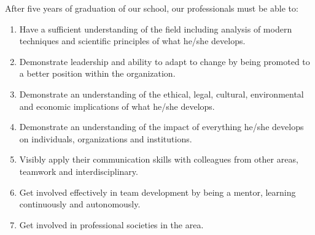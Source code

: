 After five years of graduation of our school, 
our professionals must be able to:
\begin{enumerate}
\item Have a sufficient understanding of the field including analysis of modern techniques and scientific principles of what he/she develops.
\item Demonstrate leadership and ability to adapt to change by being promoted to a better position within the organization.
\item Demonstrate an understanding of the ethical, legal, cultural, environmental and economic implications of what he/she develops.
\item Demonstrate an understanding of the impact of everything he/she develops on individuals, organizations and institutions.
\item Visibly apply their communication skills with colleagues from other areas, teamwork and interdisciplinary.
\item Get involved effectively in team development by being a mentor, learning continuously and autonomously.
\item Get involved in professional societies in the area.
\end{enumerate}